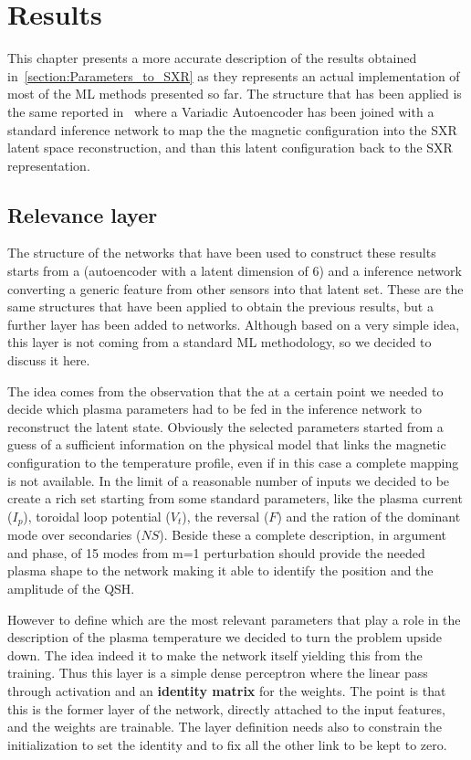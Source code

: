 \chapter{Results}
\label{section:7_Results}

This chapter presents a more accurate description of the results obtained in~\cref{section:Parameters_to_SXR} as they represents an actual implementation of most of the ML methods presented so far.
The structure that has been applied is the same reported in~\Figure{\ref{fig:SXR_from_param}} where a Variadic Autoencoder has been joined with a standard inference network to map the the magnetic configuration into the SXR latent space reconstruction, and than this latent configuration back to the SXR representation.

\section{Relevance layer}

The structure of the networks that have been used to construct these results starts from a  (autoencoder with a latent dimension of 6) and a inference network converting a generic feature from other sensors into that latent set.
These are the same structures that have been applied to obtain the previous results, but a further layer has been added to networks. Although based on a very simple idea, this layer is not coming from a standard ML methodology, so we decided to discuss it here. 

The idea comes from the observation that the at a certain point we needed to decide which plasma parameters had to be fed in the inference network to reconstruct the latent state. Obviously the selected parameters started from a guess of a sufficient information on the physical model that links the magnetic configuration to the temperature profile, even if in this case a complete mapping is not available.
In the limit of a reasonable number of inputs we decided to be create a rich set starting from some standard parameters, like the plasma current ($I_p$), toroidal loop potential ($V_t$), the reversal ($F$) and the ration of the dominant mode over secondaries ($NS$). Beside these a complete description, in argument and phase, of 15 modes from m=1 perturbation should provide the needed plasma shape to the network making it able to identify the position and the amplitude of the QSH.

However to define which are the most relevant parameters that play a role in the description of the plasma temperature we decided to turn the problem upside down. The idea indeed it to make the network itself yielding this from the training. Thus this layer is a simple dense perceptron where the linear pass through activation and an \textbf{identity matrix} for the weights. The point is that this is the former layer of the network, directly attached to the input features, and the weights are trainable. The layer definition needs also to constrain the initialization to set the identity and to fix all the other link to be kept to zero. 

